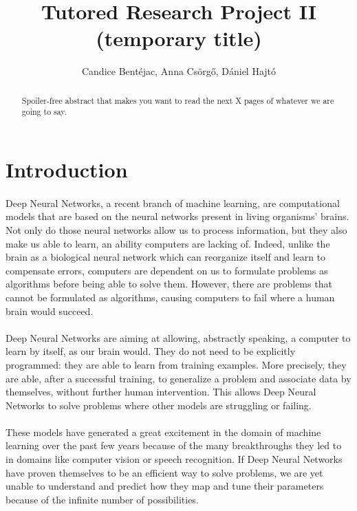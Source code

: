 \documentclass[a4paper]{article}
\title{Tutored Research Project II (temporary title)}
\author{Candice Bentéjac, Anna Csörgő, Dániel Hajtó}
\begin{document}
\maketitle

\begin{abstract}
Spoiler-free abstract that makes you want to read the next X pages of whatever we are going to say.
\end{abstract}

\section{Introduction}

\paragraph{}Deep Neural Networks, a recent branch of machine learning, are computational models that are based on the neural networks present in living organisms' brains. Not only do those neural networks allow us to process information, but they also make us able to learn, an ability computers are lacking of. Indeed, unlike the brain as a biological neural network which can reorganize itself and learn to compensate errors, computers are dependent on us to formulate problems as algorithms before being able to solve them. However, there are problems that cannot be formulated as algorithms, causing computers to fail where a human brain would succeed.

\paragraph{}Deep Neural Networks are aiming at allowing, abstractly speaking, a computer to learn by itself, as our brain would. They do not need to be explicitly programmed: they are able to learn from training examples. More precisely, they are able, after a successful training, to generalize a problem and associate data by themselves, without further human intervention. This allows Deep Neural Networks to solve problems where other models are struggling or failing.


\paragraph{}These models have generated a great excitement in the domain of machine learning over the past few years because of the many breakthroughs they led to in domains like computer vision or speech recognition. If Deep Neural Networks have proven themselves to be an efficient way to solve problems, we are yet unable to understand and predict how they map and tune their parameters because of the infinite number of possibilities.
\end{document}
